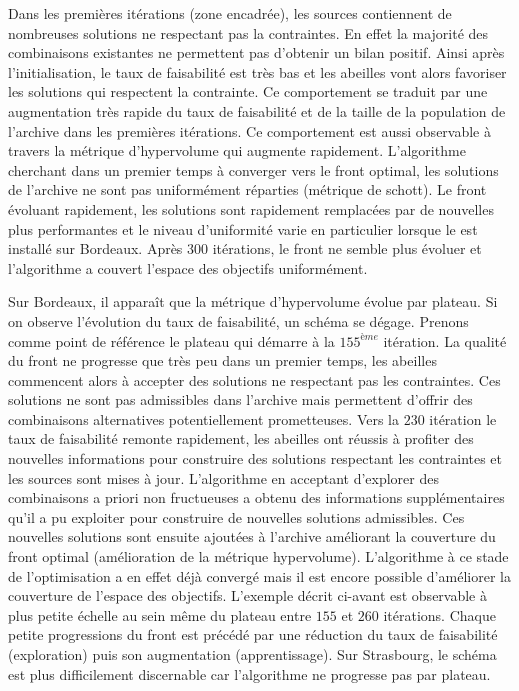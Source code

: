 Dans les premières itérations (zone encadrée), les sources contiennent de nombreuses
solutions ne respectant pas la contraintes. En effet la majorité des combinaisons
existantes ne permettent pas d’obtenir un bilan positif. Ainsi après l’initialisation, le
taux de faisabilité est très bas et les abeilles vont alors favoriser les solutions
qui respectent la contrainte. Ce comportement se traduit par une augmentation très rapide du
taux de faisabilité et de la taille de la population de l’archive dans les premières
itérations. Ce comportement est aussi observable à travers la métrique d’hypervolume qui
augmente rapidement. L’algorithme cherchant dans un premier temps à converger vers le
front optimal, les solutions de l’archive ne sont pas uniformément réparties (métrique de
schott). Le front évoluant rapidement, les solutions sont rapidement remplacées par de
nouvelles plus performantes et le niveau d’uniformité varie en particulier lorsque le
 est installé sur Bordeaux. Après $300$ itérations, le front ne semble plus
évoluer et l’algorithme a couvert l’espace des objectifs uniformément.

Sur Bordeaux, il apparaît que la métrique d’hypervolume évolue par plateau. Si on observe
l’évolution du taux de faisabilité, un schéma se dégage. Prenons comme point de référence
le plateau qui démarre à la $155^{ème}$ itération. La qualité du front ne progresse que
très peu dans un premier temps, les abeilles commencent alors à accepter des solutions ne
respectant pas les contraintes. Ces solutions ne sont pas admissibles dans l’archive mais
permettent d’offrir des combinaisons alternatives potentiellement prometteuses. Vers la
$230$ itération le taux de faisabilité remonte rapidement, les abeilles ont réussis à
profiter des nouvelles informations pour construire des solutions respectant les
contraintes et les sources sont mises à jour. L’algorithme en acceptant d’explorer des
combinaisons a priori non fructueuses a obtenu des informations supplémentaires
qu’il a pu exploiter pour construire de nouvelles solutions admissibles. Ces nouvelles
solutions sont ensuite ajoutées à l’archive améliorant la couverture du front optimal
(amélioration de la métrique hypervolume). L’algorithme à ce stade de l’optimisation a en
effet déjà convergé mais il est encore possible d’améliorer la couverture de l’espace des
objectifs.
L’exemple décrit ci-avant est observable à plus petite échelle au sein même du plateau
entre $155$ et $260$ itérations. Chaque petite progressions du front est précédé par
une réduction du taux de faisabilité (exploration) puis son augmentation (apprentissage).
Sur Strasbourg, le schéma est plus difficilement discernable car l’algorithme ne progresse
pas par plateau.

